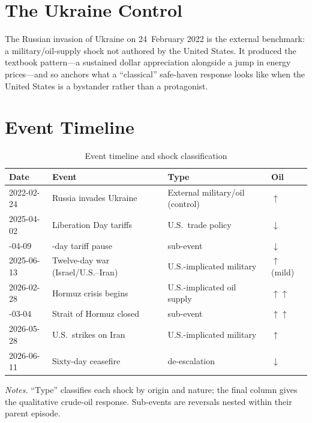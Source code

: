 \section{The Ukraine Control}
\label{sec:bg_ukraine}

The Russian invasion of Ukraine on 24~February 2022 is the external benchmark: a
military/oil-supply shock not authored by the United States. It produced the textbook
pattern---a sustained dollar appreciation alongside a jump in energy prices---and so anchors
what a ``classical'' safe-haven response looks like when the United States is a bystander
rather than a protagonist.

\section{Event Timeline}
\label{sec:bg_timeline}

\begin{table}[htbp]
\centering
\begin{threeparttable}
\caption{Event timeline and shock classification}
\label{tab:timeline}
\small
\begin{tabular}{l l l l}
\toprule
Date & Event & Type & Oil \\
\midrule
2022-02-24 & Russia invades Ukraine        & External military/oil (control) & $\uparrow$ \\
2025-04-02 & Liberation Day tariffs         & U.S.\ trade policy             & $\downarrow$ \\
\quad 2025-04-09 & \quad 90-day tariff pause & \quad sub-event                & $\downarrow$ \\
2025-06-13 & Twelve-day war (Israel/U.S.--Iran) & U.S.-implicated military   & $\uparrow$ (mild) \\
2026-02-28 & Hormuz crisis begins           & U.S.-implicated oil supply     & $\uparrow\uparrow$ \\
\quad 2026-03-04 & \quad Strait of Hormuz closed & \quad sub-event            & $\uparrow\uparrow$ \\
2026-05-28 & U.S.\ strikes on Iran          & U.S.-implicated military       & $\uparrow$ \\
2026-06-11 & Sixty-day ceasefire            & de-escalation                  & $\downarrow$ \\
\bottomrule
\end{tabular}
\begin{tablenotes}[flushleft]\footnotesize
\item \textit{Notes.} ``Type'' classifies each shock by origin and nature; the final column
gives the qualitative crude-oil response. Sub-events are reversals nested within their
parent episode.
\end{tablenotes}
\end{threeparttable}
\end{table}

